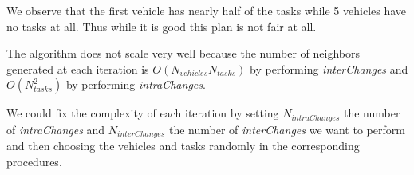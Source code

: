 \documentclass[11pt]{article}
\begin{document}
We observe that the first vehicle has nearly half of the tasks while 5 vehicles have no tasks at all. Thus while it is good this plan is not fair at all.

The algorithm does not scale very well because the number of neighbors generated at each iteration is $O(N_{vehicles}N_{tasks})$ by performing \textit{interChanges} and $O(N_{tasks}^2)$ by performing \textit{intraChanges}. 

We could fix the complexity of each iteration by setting $N_{intraChanges}$ the number of \textit{intraChanges} and $N_{interChanges}$ the number of \textit{interChanges} we want to perform and then choosing the vehicles and tasks randomly in the corresponding procedures.
\end{document}
